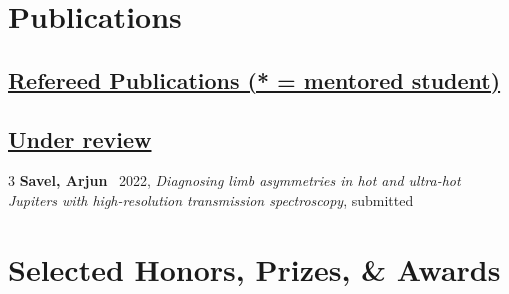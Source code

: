 \documentclass[letterpaper,12pt]{article}
\newcommand{\resumeSubHeadingListStart}{\begin{itemize}[leftmargin=*]}
\newcommand{\resumeSubHeadingListEnd}{\end{itemize}}
\newcommand{\resumeItemListEnd}{\end{itemize}\vspace{-5pt}}
\newcommand{\shorterSection}[1]{\vspace{-10pt}\section{#1}}
\newcommand{\shortershorterSection}[1]{\vspace{-10pt}\subsection{#1}}
\begin{document}


\shorterSection{Publications}

\shortershorterSection{\underline{Refereed Publications (* = mentored student)}}
\small
\begin{list}{}{\cvlist}
    
  \end{list}

\shortershorterSection{\underline{Under review}}
\small
\begin{list}{}{\cvlist}
\item[{\color{numcolor}\scriptsize{3}}]\textbf{Savel, Arjun} \etal\, 2022, \emph{Diagnosing limb asymmetries in hot and ultra-hot Jupiters with high-resolution transmission spectroscopy}, submitted

\end{list}

\shorterSection{Selected Honors, Prizes, \& Awards}
\small
  \begin{list}{}{\cvlist}
    
\end{list}
\end{document}
